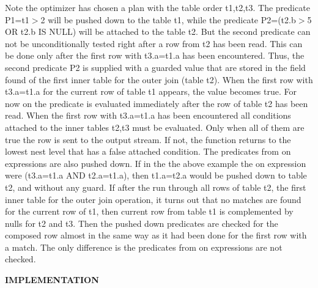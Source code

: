 \begin{DoxyNote}{Note}
 the optimizer has chosen a plan with the table order t1,t2,t3. The predicate P1=t1$>$2 will be pushed down to the table t1, while the predicate P2=(t2.\+b$>$5 OR t2.\+b IS N\+U\+LL) will be attached to the table t2. But the second predicate can not be unconditionally tested right after a row from t2 has been read. This can be done only after the first row with t3.\+a=t1.\+a has been encountered. Thus, the second predicate P2 is supplied with a guarded value that are stored in the field \textquotesingle{}found\textquotesingle{} of the first inner table for the outer join (table t2). When the first row with t3.\+a=t1.\+a for the current row of table t1 appears, the value becomes true. For now on the predicate is evaluated immediately after the row of table t2 has been read. When the first row with t3.\+a=t1.\+a has been encountered all conditions attached to the inner tables t2,t3 must be evaluated. Only when all of them are true the row is sent to the output stream. If not, the function returns to the lowest nest level that has a false attached condition. The predicates from on expressions are also pushed down. If in the the above example the on expression were (t3.\+a=t1.\+a A\+ND t2.\+a=t1.\+a), then t1.\+a=t2.\+a would be pushed down to table t2, and without any guard. If after the run through all rows of table t2, the first inner table for the outer join operation, it turns out that no matches are found for the current row of t1, then current row from table t1 is complemented by nulls for t2 and t3. Then the pushed down predicates are checked for the composed row almost in the same way as it had been done for the first row with a match. The only difference is the predicates from on expressions are not checked.
\end{DoxyNote}
\begin{DoxyParagraph}{}
{\bfseries I\+M\+P\+L\+E\+M\+E\+N\+T\+A\+T\+I\+ON} 
\end{DoxyParagraph}
